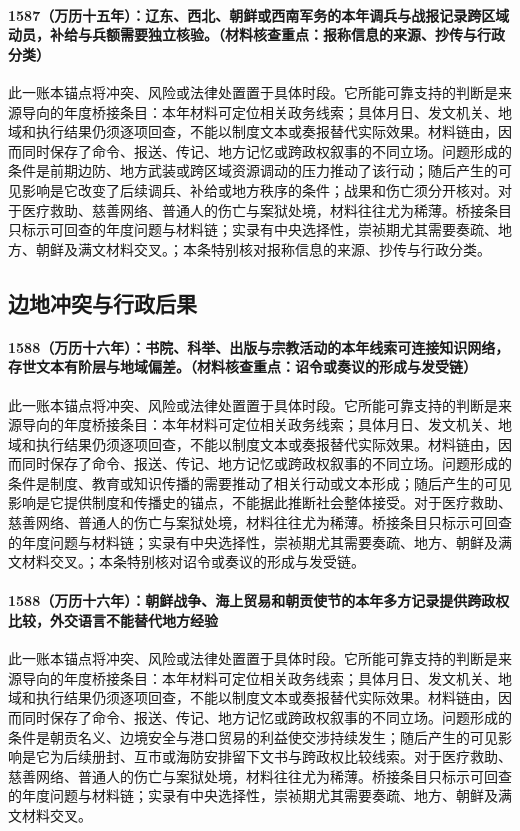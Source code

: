 \paragraph{1587（万历十五年）：辽东、西北、朝鲜或西南军务的本年调兵与战报记录跨区域动员，补给与兵额需要独立核验。（材料核查重点：报称信息的来源、抄传与行政分类）} 此一账本锚点将冲突、风险或法律处置置于具体时段。它所能可靠支持的判断是来源导向的年度桥接条目：本年材料可定位相关政务线索；具体月日、发文机关、地域和执行结果仍须逐项回查，不能以制度文本或奏报替代实际效果。材料链由，因而同时保存了命令、报送、传记、地方记忆或跨政权叙事的不同立场。问题形成的条件是前期边防、地方武装或跨区域资源调动的压力推动了该行动；随后产生的可见影响是它改变了后续调兵、补给或地方秩序的条件；战果和伤亡须分开核对。对于医疗救助、慈善网络、普通人的伤亡与案狱处境，材料往往尤为稀薄。桥接条目只标示可回查的年度问题与材料链；实录有中央选择性，崇祯期尤其需要奏疏、地方、朝鲜及满文材料交叉。；本条特别核对报称信息的来源、抄传与行政分类。

\subsection{边地冲突与行政后果}

\paragraph{1588（万历十六年）：书院、科举、出版与宗教活动的本年线索可连接知识网络，存世文本有阶层与地域偏差。（材料核查重点：诏令或奏议的形成与发受链）} 此一账本锚点将冲突、风险或法律处置置于具体时段。它所能可靠支持的判断是来源导向的年度桥接条目：本年材料可定位相关政务线索；具体月日、发文机关、地域和执行结果仍须逐项回查，不能以制度文本或奏报替代实际效果。材料链由，因而同时保存了命令、报送、传记、地方记忆或跨政权叙事的不同立场。问题形成的条件是制度、教育或知识传播的需要推动了相关行动或文本形成；随后产生的可见影响是它提供制度和传播史的锚点，不能据此推断社会整体接受。对于医疗救助、慈善网络、普通人的伤亡与案狱处境，材料往往尤为稀薄。桥接条目只标示可回查的年度问题与材料链；实录有中央选择性，崇祯期尤其需要奏疏、地方、朝鲜及满文材料交叉。；本条特别核对诏令或奏议的形成与发受链。

\paragraph{1588（万历十六年）：朝鲜战争、海上贸易和朝贡使节的本年多方记录提供跨政权比较，外交语言不能替代地方经验} 此一账本锚点将冲突、风险或法律处置置于具体时段。它所能可靠支持的判断是来源导向的年度桥接条目：本年材料可定位相关政务线索；具体月日、发文机关、地域和执行结果仍须逐项回查，不能以制度文本或奏报替代实际效果。材料链由，因而同时保存了命令、报送、传记、地方记忆或跨政权叙事的不同立场。问题形成的条件是朝贡名义、边境安全与港口贸易的利益使交涉持续发生；随后产生的可见影响是它为后续册封、互市或海防安排留下文书与跨政权比较线索。对于医疗救助、慈善网络、普通人的伤亡与案狱处境，材料往往尤为稀薄。桥接条目只标示可回查的年度问题与材料链；实录有中央选择性，崇祯期尤其需要奏疏、地方、朝鲜及满文材料交叉。

